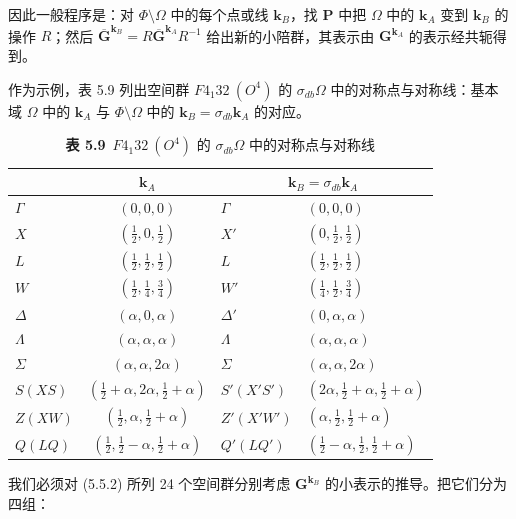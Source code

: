 因此一般程序是：对 $\Phi \setminus \Omega$ 中的每个点或线 $\mathbf{k}_{B}$，找 $\mathbf{P}$ 中把 $\Omega$ 中的 $\mathbf{k}_{A}$ 变到 $\mathbf{k}_{B}$ 的操作 $R$；然后 $\overline{\mathbf{G}}^{\mathbf{k}_{B}} = R\overline{\mathbf{G}}^{\mathbf{k}_{A}}R^{-1}$ 给出新的小陪群，其表示由 $\mathbf{G}^{\mathbf{k}_{A}}$ 的表示经共轭得到。

作为示例，表 5.9 列出空间群 $F4_{1}32\ (O^{4})$ 的 $\sigma_{db}\Omega$ 中的对称点与对称线：基本域 $\Omega$ 中的 $\mathbf{k}_{A}$ 与 $\Phi \setminus \Omega$ 中的 $\mathbf{k}_{B} = \sigma_{db}\mathbf{k}_{A}$ 的对应。

\begin{table}[H]
\centering
\caption*{\textbf{表 5.9}\ $F4_{1}32\ (O^{4})$ 的 $\sigma_{db}\Omega$ 中的对称点与对称线}
\begin{tabular}{@{}lcll@{}}
\toprule
 & $\mathbf{k}_{A}$ & \multicolumn{2}{c}{$\mathbf{k}_{B} = \sigma_{db}\mathbf{k}_{A}$}\\
\midrule
$\Gamma$ & $(0, 0, 0)$ & $\Gamma$ & $(0, 0, 0)$\\
$X$ & $(\frac{1}{2}, 0, \frac{1}{2})$ & $X'$ & $(0, \frac{1}{2}, \frac{1}{2})$\\
$L$ & $(\frac{1}{2}, \frac{1}{2}, \frac{1}{2})$ & $L$ & $(\frac{1}{2}, \frac{1}{2}, \frac{1}{2})$\\
$W$ & $(\frac{1}{2}, \frac{1}{4}, \frac{3}{4})$ & $W'$ & $(\frac{1}{4}, \frac{1}{2}, \frac{3}{4})$\\
$\Delta$ & $(\alpha, 0, \alpha)$ & $\Delta'$ & $(0, \alpha, \alpha)$\\
$\Lambda$ & $(\alpha, \alpha, \alpha)$ & $\Lambda$ & $(\alpha, \alpha, \alpha)$\\
$\Sigma$ & $(\alpha, \alpha, 2\alpha)$ & $\Sigma$ & $(\alpha, \alpha, 2\alpha)$\\
$S(XS)$ & $(\frac{1}{2}+\alpha, 2\alpha, \frac{1}{2}+\alpha)$ & $S'(X'S')$ & $(2\alpha, \frac{1}{2}+\alpha, \frac{1}{2}+\alpha)$\\
$Z(XW)$ & $(\frac{1}{2}, \alpha, \frac{1}{2}+\alpha)$ & $Z'(X'W')$ & $(\alpha, \frac{1}{2}, \frac{1}{2}+\alpha)$\\
$Q(LQ)$ & $(\frac{1}{2}, \frac{1}{2}-\alpha, \frac{1}{2}+\alpha)$ & $Q'(LQ')$ & $(\frac{1}{2}-\alpha, \frac{1}{2}, \frac{1}{2}+\alpha)$\\
\bottomrule
\end{tabular}
\end{table}

我们必须对 (5.5.2) 所列 24 个空间群分别考虑 $\mathbf{G}^{\mathbf{k}_{B}}$ 的小表示的推导。把它们分为四组：

